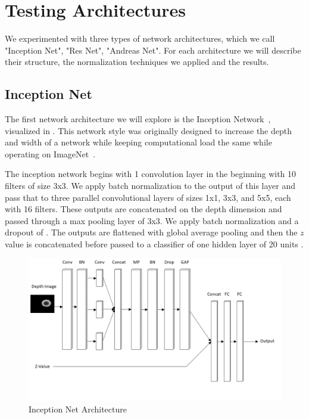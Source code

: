 
\section{Testing Architectures}
\label{sec:archs}

We experimented with three types of network architectures, which we call "Inception Net", "Res Net", "Andreas Net". 
For each architecture we will describe their structure, the normalization techniques we applied and the results. 
 



\subsection{Inception Net}
The first network architecture we will explore is the Inception Network~\cite{szegedy2015going}, visualized in . 
This network style was originally designed to increase the depth and width of a network while keeping computational load the same while operating on ImageNet~\cite{deng2009imagenet}. 

The inception network begins with 1 convolution layer in the beginning with 10 filters of size 3x3. 
We apply batch normalization to the output of this layer and pass that to three parallel convolutional layers of sizes 1x1, 3x3, and 5x5, each with 16 filters. 
These outputs are concatenated on the depth dimension and passed through a max pooling layer of 3x3.
We apply batch normalization and a dropout of . 
The outputs are flattened with global average pooling and then the $z$ value is concatenated before passed to a classifier of one hidden layer of 20 units . 


\begin{figure}[t!]
    \includegraphics[width=0.99\columnwidth]{figs/inception_net.png}
\caption{Inception Net Architecture} \label{fig:inception_net}
\end{figure}


